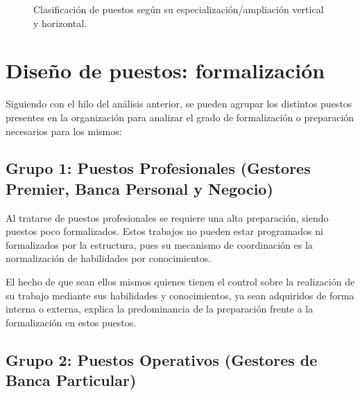 \begin{figure}[htbp]
    \caption{Clasificación de puestos según su especialización/ampliación vertical y horizontal.}
    \label{fig:especializacion_puestos}
\end{figure}

\newpage

\section{Diseño de puestos: formalización}

Siguiendo con el hilo del análisis anterior, se pueden agrupar los distintos puestos presentes en la organización para analizar el grado de formalización o preparación necesarios para los mismos:

\subsection{Grupo 1: Puestos Profesionales (Gestores Premier, Banca Personal y Negocio)}

Al tratarse de puestos profesionales se requiere una alta preparación, siendo puestos poco formalizados. Estos trabajos no pueden estar programados ni formalizados por la estructura, pues su mecanismo de coordinación es la normalización de habilidades por conocimientos.

El hecho de que sean ellos mismos quienes tienen el control sobre la realización de su trabajo mediante sus habilidades y conocimientos, ya sean adquiridos de forma interna o externa, explica la predominancia de la preparación frente a la formalización en estos puestos.

\subsection{Grupo 2: Puestos Operativos (Gestores de Banca Particular)}


